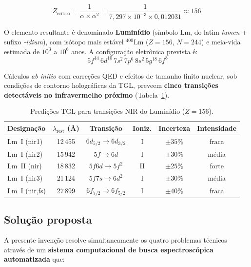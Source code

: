 \documentclass[12pt,a4paper]{article}
\newcommand{\alphaii}{\alpha^2}
\newcommand{\Zcrit}{Z_{\text{cr\'{i}tico}}}
\newcommand{\Lm}{\text{Lm}}
\begin{document}
\begin{equation}
\boxed{
\Zcrit = \frac{1}{\alpha \times \alphaii}
  = \frac{1}{7{,}297 \times 10^{-3} \times 0{,}012031}
  \approx 156
}
\label{eq:z_critico}
\end{equation}

O elemento resultante é denominado \textbf{Luminídio} (símbolo Lm,
do latim \textit{lumen} + sufixo \textit{-idium}), com isótopo
mais estável ${}^{400}\Lm$ ($Z = 156$, $N = 244$) e meia-vida
estimada de $10^3$ a $10^6$ anos. A configuração eletrônica
prevista é:
\begin{equation}
[\text{Og}]\; 5f^{14}\, 6d^{10}\, 7s^2\, 7p^6\, 8s^2\, 5g^{18}\, 6f^8
\label{eq:config}
\end{equation}

Cálculos \textit{ab initio} com correções QED e efeitos de
tamanho finito nuclear, sob condições de contorno holográficas
da TGL, preveem \textbf{cinco transições detectáveis no
infravermelho próximo} (Tabela~\ref{tab:predicoes}).

\begin{table}[H]
\centering
\caption{Predições TGL para transições NIR do Luminídio ($Z = 156$).}
\label{tab:predicoes}
\begin{tabular}{lccccc}
\toprule
\textbf{Designação} & $\lambda_{\text{rest}}$ (\AA) &
  \textbf{Transição} & \textbf{Ioniz.} &
  \textbf{Incerteza} & \textbf{Intensidade} \\
\midrule
Lm~I (nir1) & 12\,455 & $6d_{5/2} \to 6d_{3/2}$ & I &
  $\pm 35\%$ & fraca \\
Lm~I (nir2) & 15\,942 & $5f \to 6d$ & I &
  $\pm 30\%$ & média \\
Lm~II (nir) & 18\,832 & $5f6d \to 5f^2$ & II &
  $\pm 25\%$ & forte \\
Lm~I (nir3) & 21\,124 & $5f7s \to 6d^2$ & I &
  $\pm 30\%$ & média \\
Lm~I (nir,fs) & 27\,899 & $6f_{7/2} \to 6f_{5/2}$ & I &
  $\pm 40\%$ & fraca \\
\bottomrule
\end{tabular}
\end{table}

\subsection{Solução proposta}

A presente invenção resolve simultaneamente os quatro problemas
técnicos através de um \textbf{sistema computacional de busca
espectroscópica automatizada} que:
\end{document}
